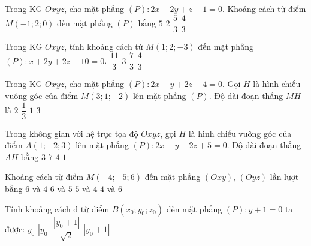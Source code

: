 \begin{ex}%
	Trong KG $Oxyz$, cho mặt phẳng $(P)\colon 2x-2y+z-1=0$. Khoảng cách từ điểm $M\left(-1;2;0\right)$ đến mặt phẳng $(P)$ bằng
\choice
{$5$}
{$2$}
{\True $\dfrac{5}{3}$}
{$\dfrac{4}{3}$}
\end{ex}

\begin{ex}%
	Trong KG $Oxyz$, tính khoảng cách từ $M\left(1;2;-3\right)$ đến mặt phẳng $(P)\colon x+2y+2z-10=0$.
\choice
{\True $\dfrac{11}{3}$}
{$3$}
{$\dfrac{7}{3}$}
{$\dfrac{4}{3}$}
\end{ex}

\begin{ex}%
	Trong KG $Oxyz$, cho mặt phẳng $(P)\colon 2x-y+2z-4=0$. Gọi $H$ là hình chiếu vuông góc của điểm $M\left(3;1;-2\right)$ lên mặt phẳng $(P)$. Độ dài đoạn thẳng $MH$ là
\choice
{$2$}
{$\dfrac{1}{3}$}
{\True $1$}
{$3$}
\end{ex}

\begin{ex}%
	Trong không gian với hệ trục tọa độ $Oxyz$, gọi $H$ là hình chiếu vuông góc của điểm $A(1;-2;3)$ lên mặt phẳng $(P)\colon 2x-y-2z+5=0$. Độ dài đoạn thẳng $AH$ bằng
\choice
{$3$}
{$7$}
{$4$}
{$1$}
\end{ex}

\begin{ex}%
	Khoảng cách từ điểm $M(-4;-5;6)$ đến mặt phẳng $(Oxy)$, $(Oyz)$ lần lượt bằng
\choice
{\True $6$ và $4$}
{$6$ và $5$}
{$5$ và $4$}
{$4$ và $6$}
\end{ex}

\begin{ex}%
	Tính khoảng cách $\mathrm{d}$ từ điểm $B\left(x_0;y_0;z_0\right)$ đến mặt phẳng $(P)\colon y + 1 = 0$ ta được:
\choice
{$y_0$}
{$\left| y_0\right|$}
{$\dfrac{\left| y_0+1\right|}{\sqrt{2}}$}
{\True $\left| y_0+1\right|$}
\end{ex}

